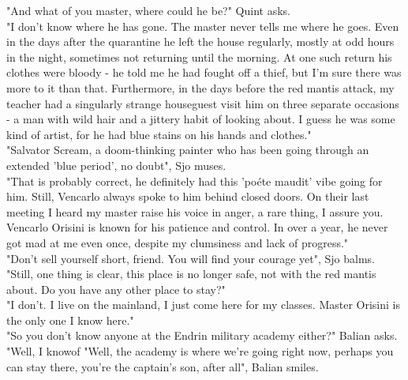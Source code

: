 "And what of you master, where could he be?" Quint asks.\\

"I don't know where he has gone. The master never tells me where he goes. Even in the days after the quarantine he left the house regularly, mostly at odd hours in the night, sometimes not returning until the morning. At one such return his clothes were bloody - he told me he had fought off a thief, but I'm sure there was more to it than that. Furthermore, in the days before the red mantis attack, my teacher had a singularly strange houseguest visit him on three separate occasions - a man with wild hair and a jittery habit of looking about. I guess he was some kind of artist, for he had blue stains on his hands and clothes."\\

"Salvator Scream, a doom-thinking painter who has been going through an extended 'blue period', no doubt", Sjo muses.\\

"That is probably correct, he definitely had this 'po\'ete maudit' vibe going for him. Still, Vencarlo always spoke to him behind closed doors. On their last meeting I heard my master raise his voice in anger, a rare thing, I assure you. Vencarlo Orisini is known for his patience and control. In over a year, he never got mad at me even once, despite my clumsiness and lack of progress."\\

"Don't sell yourself short, friend. You will find your courage yet", Sjo balms. "Still, one thing is clear, this place is no longer safe, not with the red mantis about. Do you have any other place to stay?"\\

"I don't. I live on the mainland, I just come here for my classes. Master Orisini is the only one I know here."\\

"So you don't know anyone at the Endrin military academy either?" Balian asks.\\

"Well, I knowof "Well, the academy is where we're going right now, perhaps you can stay there, you're the captain's son, after all", Balian smiles.\\

